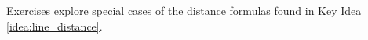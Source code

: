 {\noindent Exercises}
{ explore special cases of the distance formulas found in Key Idea \ref{idea:line_distance}.
}
